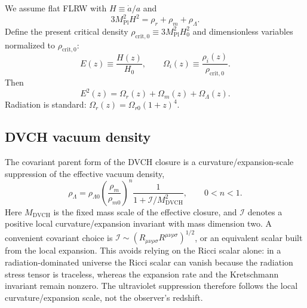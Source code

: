 \documentclass[pdflatex,sn-mathphys-num]{sn-jnl}%
\newcommand{\mpl}{M_{\mathrm{Pl}}}
\newcommand{\Omr}{\Omega_{r0}}
\newcommand{\Ecrit}{\rho_{\mathrm{crit},0}}
\begin{document}
We assume flat FLRW with $H\equiv \dot a/a$ and
\begin{equation}
3\mpl^2 H^2 = \rho_r+\rho_m+\rho_\Lambda.
\end{equation}
Define the present critical density $\Ecrit\equiv 3\mpl^2 H_0^2$ and
dimensionless variables normalized to $\Ecrit$:
\begin{equation}
E(z)\equiv \frac{H(z)}{H_0},\qquad
\Omega_i(z)\equiv\frac{\rho_i(z)}{\Ecrit}.
\end{equation}
Then
\begin{equation}
E^2(z)=\Omega_r(z)+\Omega_m(z)+\Omega_\Lambda(z).
\label{eq:E2_sum}
\end{equation}
Radiation is standard: $\Omega_r(z)=\Omr(1+z)^4$.



\subsection{DVCH vacuum density}
\label{subsec:rhoLambda}

The covariant parent form of the DVCH closure is a curvature/expansion-scale
suppression of the effective vacuum density,
\begin{equation}
\boxed{\rho_\Lambda=
\rho_{\Lambda0}
\left(\frac{\rho_m}{\rho_{m0}}\right)^n
\frac{1}{1+\mathcal{I}/M_{\mathrm{DVCH}}^2}},
\qquad 0<n<1.
\label{eq:DVCH_covariant}
\end{equation}
Here $M_{\mathrm{DVCH}}$ is the fixed mass scale of the effective closure, and
$\mathcal{I}$ denotes a positive local curvature/expansion invariant with
mass dimension two. A convenient covariant choice is
$\mathcal{I}\sim (R_{\mu\nu\rho\sigma}R^{\mu\nu\rho\sigma})^{1/2}$, or an
equivalent scalar built from the local expansion. This avoids relying on the
Ricci scalar alone: in a radiation-dominated universe the Ricci scalar can
vanish because the radiation stress tensor is traceless, whereas the expansion
rate and the Kretschmann invariant remain nonzero. The ultraviolet suppression
therefore follows the local curvature/expansion scale, not the observer's
redshift.
\end{document}
